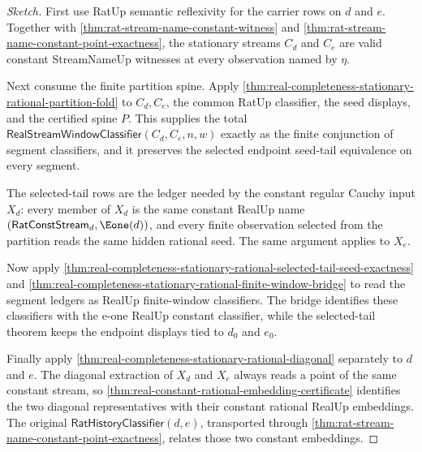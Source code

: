 \begin{proof}[Sketch]
First use RatUp semantic reflexivity for the carrier rows on $d$ and $e$.
Together with
\autoref{thm:rat-stream-name-constant-witness} and
\autoref{thm:rat-stream-name-constant-point-exactness}, the stationary streams
$C_d$ and $C_e$ are valid constant StreamNameUp witnesses at every observation
named by $\eta$.

Next consume the finite partition spine. Apply
\autoref{thm:real-completeness-stationary-rational-partition-fold} to
$C_d,C_e$, the common RatUp classifier, the seed displays, and the certified
spine $P$. This supplies the total
$\mathsf{RealStreamWindowClassifier}(C_d,C_e,n,w)$ exactly as the finite
conjunction of segment classifiers, and it preserves the selected endpoint
seed-tail equivalence on every segment.

The selected-tail rows are the ledger needed by the constant regular Cauchy
input $X_d$: every member of $X_d$ is the same constant RealUp name
$(\mathsf{RatConstStream}_d,\Eone(d))$, and every finite observation selected
from the partition reads the same hidden rational seed. The same argument
applies to $X_e$.

Now apply
\autoref{thm:real-completeness-stationary-rational-selected-tail-seed-exactness}
and
\autoref{thm:real-completeness-stationary-rational-finite-window-bridge} to
read the segment ledgers as RealUp finite-window classifiers. The bridge
identifies these classifiers with the e-one RealUp constant classifier, while
the selected-tail theorem keeps the endpoint displays tied to $d_0$ and $e_0$.

Finally apply
\autoref{thm:real-completeness-stationary-rational-diagonal} separately to
$d$ and $e$. The diagonal extraction of $X_d$ and $X_e$ always reads a point of
the same constant stream, so
\autoref{thm:real-constant-rational-embedding-certificate} identifies the two
diagonal representatives with their constant rational RealUp embeddings. The
original $\mathsf{RatHistoryClassifier}(d,e)$, transported through
\autoref{thm:rat-stream-name-constant-point-exactness}, relates those two
constant embeddings.
\end{proof}

